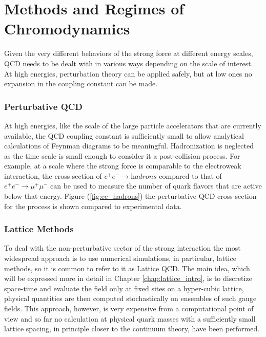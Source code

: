 \section{Methods and Regimes of Chromodynamics}
Given the very different behaviors of the strong force at different energy scales, QCD needs to be dealt with in various ways depending on the scale of interest. At high energies, perturbation theory can be applied safely, but at low ones no expansion in the coupling constant can be made. 

\subsubsection{Perturbative QCD}
At high energies, like the scale of the large particle accelerators that are currently available, the QCD coupling constant is sufficiently small to allow analytical calculations of Feynman diagrams to be meaningful. Hadronization is neglected as the time scale is small enough to consider it a post-collision process. 
For example, at a scale where the strong force is comparable to the electroweak interaction, the cross section of $e^+e^-\rightarrow \textit{hadrons}$ compared to that of $e^+e^-\rightarrow \mu^+\mu^-$ can be used to measure the number of quark flavors that are active below that energy. Figure (\ref{fig:ee_hadrons}) the perturbative QCD cross section for the process is shown compared to experimental data.


\subsubsection{Lattice Methods} 
To deal with the non-perturbative sector of the strong interaction the most widespread approach is to use numerical simulations, in particular, lattice methods, so it is common to refer to it as Lattice QCD. The main idea, which will be expressed more in detail in Chapter \ref{chap:lattice_intro}, is to discretize space-time and evaluate the field only at fixed sites on a hyper-cubic lattice, physical quantities are then computed stochastically on ensembles of such gauge fields. This approach, however, is very expensive from a computational point of view and so far no calculation at physical quark masses with a sufficiently small lattice spacing, in principle closer to the continuum theory, have been performed.

